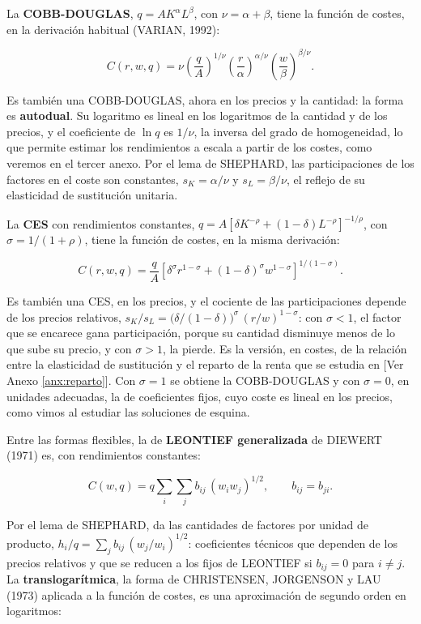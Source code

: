 \documentclass[10pt,a4paper]{article}
\newcommand{\authorfont}[1]{{\fontfamily{EBGaramond-TLF}\selectfont #1}}
\newcounter{anexo}
\begin{document}
La \textbf{COBB-DOUGLAS}, $q=AK^\alpha L^\beta$, con $\nu=\alpha+\beta$, tiene la función de costes, en la derivación habitual (VARIAN, 1992):

$$C(r,w,q)=\nu\left(\frac{q}{A}\right)^{1/\nu}\left(\frac{r}{\alpha}\right)^{\alpha/\nu}\left(\frac{w}{\beta}\right)^{\beta/\nu}.$$

Es también una COBB-DOUGLAS, ahora en los precios y la cantidad: la forma es \textbf{autodual}. Su logaritmo es lineal en los logaritmos de la cantidad y de los precios, y el coeficiente de $\ln q$ es $1/\nu$, la inversa del grado de homogeneidad, lo que permite estimar los rendimientos a escala a partir de los costes, como veremos en el tercer anexo. Por el lema de SHEPHARD, las participaciones de los factores en el coste son constantes, $s_K=\alpha/\nu$ y $s_L=\beta/\nu$, el reflejo de su elasticidad de sustitución unitaria.

La \textbf{CES} con rendimientos constantes, $q=A\left[\delta K^{-\rho}+(1-\delta)L^{-\rho}\right]^{-1/\rho}$, con $\sigma=1/(1+\rho)$, tiene la función de costes, en la misma derivación:

$$C(r,w,q)=\frac{q}{A}\left[\delta^\sigma r^{1-\sigma}+(1-\delta)^\sigma w^{1-\sigma}\right]^{1/(1-\sigma)}.$$

Es también una CES, en los precios, y el cociente de las participaciones depende de los precios relativos, $s_K/s_L=\big(\delta/(1-\delta)\big)^\sigma\,(r/w)^{1-\sigma}$: con $\sigma<1$, el factor que se encarece gana participación, porque su cantidad disminuye menos de lo que sube su precio, y con $\sigma>1$, la pierde. Es la versión, en costes, de la relación entre la elasticidad de sustitución y el reparto de la renta que se estudia en [\authorfont{Ver Anexo \ref{anx:reparto}}]. Con $\sigma=1$ se obtiene la COBB-DOUGLAS y con $\sigma=0$, en unidades adecuadas, la de coeficientes fijos, cuyo coste es lineal en los precios, como vimos al estudiar las soluciones de esquina.

Entre las formas flexibles, la de \textbf{LEONTIEF generalizada} de DIEWERT (1971) es, con rendimientos constantes:

$$C(w,q)=q\sum_i\sum_j b_{ij}\,(w_iw_j)^{1/2},\qquad b_{ij}=b_{ji}.$$

Por el lema de SHEPHARD, da las cantidades de factores por unidad de producto, $h_i/q=\sum_j b_{ij}\,(w_j/w_i)^{1/2}$: coeficientes técnicos que dependen de los precios relativos y que se reducen a los fijos de LEONTIEF si $b_{ij}=0$ para $i\neq j$. La \textbf{translogarítmica}, la forma de CHRISTENSEN, JORGENSON y LAU (1973) aplicada a la función de costes, es una aproximación de segundo orden en logaritmos:
\end{document}
